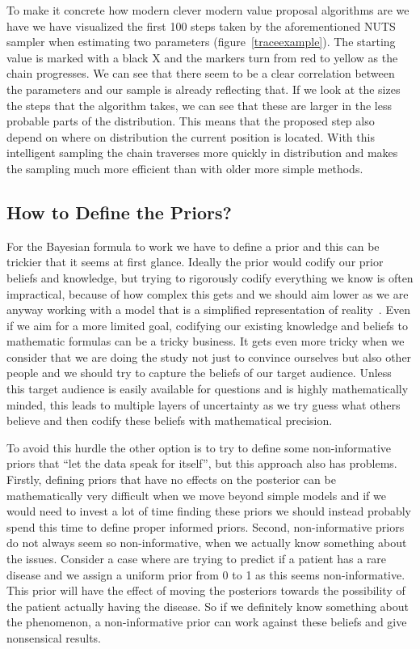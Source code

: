\documentclass[12pt,a4paper,leqno]{report}
\theoremstyle{plain}
\theoremstyle{definition}
\theoremstyle{remark}
\begin{document}
To make it concrete how modern clever modern value proposal algorithms are we
have we have visualized the first 100 steps taken by the aforementioned NUTS sampler
when estimating two parameters (figure\ \ref{traceexample}). The starting value is
marked with a black X and the markers turn from red to yellow as the chain progresses.
We can see that there seem to be a clear correlation between the parameters and our
sample is already reflecting that. If we look at the sizes the steps that the algorithm
takes, we can see that these are larger in the less probable parts of the distribution.
This means that the proposed step also depend on where on distribution the current position
is located. With this intelligent sampling the chain traverses more
quickly in distribution and makes the sampling much more efficient than with older more
simple methods.

\subsection{How to Define the Priors?}\label{bayesproblems}

For the Bayesian formula to work we have to define a prior and this can be
trickier that it seems at first glance. Ideally the prior would codify our prior
beliefs and knowledge, but trying to rigorously codify everything we
know is often impractical, because of how complex this gets and we should aim lower as we are
anyway working with a model that is a simplified representation of reality\ \cite{gelman}. Even if
we aim for a more limited goal, codifying our existing knowledge and beliefs
to mathematic formulas can be a tricky business. It gets even more
tricky when we consider that we are doing the study not just to convince ourselves
but also other people and we should try to capture the beliefs of our target audience.
Unless this target audience is easily available for questions and is highly mathematically minded,
this leads to multiple layers of uncertainty as we try guess what others
believe and then codify these beliefs with mathematical precision.

To avoid this hurdle the other option is to try to define some non-informative
priors that ``let the data speak for itself'', but this approach also has
problems. Firstly, defining priors that have no effects on the posterior can be mathematically
very difficult when we move beyond simple models and if we would need
to invest a lot of time finding these priors we should instead probably spend this time
to define proper informed priors. Second, non-informative priors do not always
seem so non-informative, when we actually know something about the issues.
Consider a case where are trying to predict if a patient has a rare disease
and we assign a uniform prior from 0 to 1 as this seems non-informative. This
prior will have the effect of moving the posteriors towards the
possibility of the patient actually having the disease. So if we definitely know
something about the phenomenon, a non-informative prior can work against these
beliefs and give nonsensical results.\ \cite{gelman}
\end{document}
